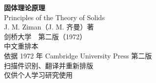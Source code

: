 \documentclass[11pt,a4paper,twoside,openright]{ctexbook}
\begin{document}
\frontmatter
\begin{titlepage}
\centering
{\Huge\bfseries 固体理论原理\\[5em]}
{\Large Principles of the Theory of Solids\\[3em]}
{\Large J. M. Ziman（J. M. 齐曼）\quad 著\\[1em]}
{\large 剑桥大学　第二版（1972）\\[5em]}
{\large 中文重排本\\[0.5em]}
{\large 依据 1972 年 Cambridge University Press 第二版\\[0.3em]
扫描件识别、翻译并重新排版\\[0.3em]
仅供个人学习研究使用\\[3em]}
\end{titlepage}
\thispagestyle{empty}\mbox{}\clearpage
\tableofcontents



\mainmatter














\end{document}
